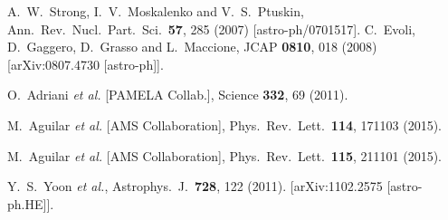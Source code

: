\documentclass[prd,aps,twocolumn]{revtex4}
\begin{document}
\begin{thebibliography}{99}


A.~W.~Strong, I.~V.~Moskalenko and V.~S.~Ptuskin,
  Ann.\ Rev.\ Nucl.\ Part.\ Sci.\  {\bf 57}, 285 (2007)
  [astro-ph/0701517].
 C.~Evoli, D.~Gaggero, D.~Grasso and L.~Maccione,
  JCAP {\bf 0810}, 018 (2008)
  [arXiv:0807.4730 [astro-ph]].



O.~Adriani {\it et al.}  [PAMELA Collab.],
  Science {\bf 332}, 69 (2011).

  M.~Aguilar {\it et al.} [AMS Collaboration],
  Phys.\ Rev.\ Lett.\  {\bf 114}, 171103 (2015).



  M.~Aguilar {\it et al.} [AMS Collaboration],
  Phys.\ Rev.\ Lett.\  {\bf 115}, 211101 (2015).


  Y.~S.~Yoon {\it et al.}, %
  Astrophys.\ J.\  {\bf 728}, 122 (2011).
  [arXiv:1102.2575 [astro-ph.HE]].


\end{thebibliography}
\end{document}
